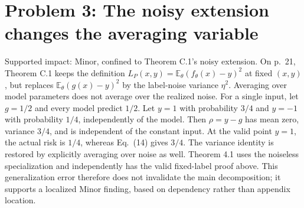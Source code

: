 \documentclass[10pt]{article}
\begin{document}
\section*{Problem 3: The noisy extension changes the averaging variable}
Supported impact: Minor, confined to Theorem C.1’s noisy extension. On p. 21, Theorem C.1 keeps the definition \(L_P(x,y)=\mathbb E_\theta(f_\theta(x)-y)^2\) at fixed \((x,y)\), but replaces \(\mathbb E_\theta(g(x)-y)^2\) by the label-noise variance \(\eta^2\). Averaging over model parameters does not average over the realized noise. For a single input, let \(g=1/2\) and every model predict \(1/2\). Let \(y=1\) with probability \(3/4\) and \(y=-1\) with probability \(1/4\), independently of the model. Then \(\rho=y-g\) has mean zero, variance \(3/4\), and is independent of the constant input. At the valid point \(y=1\), the actual risk is \(1/4\), whereas Eq. (14) gives \(3/4\). The variance identity is restored by explicitly averaging over noise as well. Theorem 4.1 uses the noiseless specialization and independently has the valid fixed-label proof above. This generalization error therefore does not invalidate the main decomposition; it supports a localized Minor finding, based on dependency rather than appendix location.\par
\end{document}

